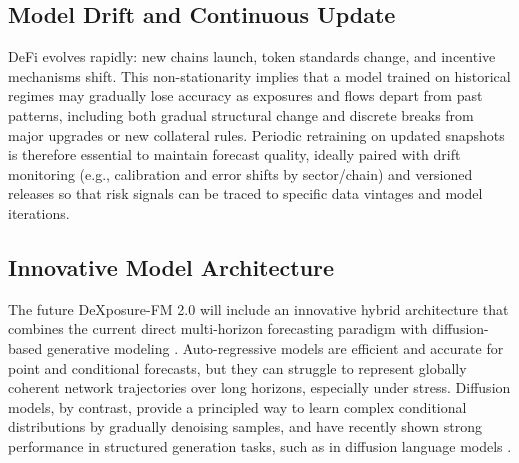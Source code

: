 \subsection{Model Drift and Continuous Update}
DeFi evolves rapidly: new chains launch, token standards change, and incentive mechanisms shift. This non-stationarity implies that a model trained on historical regimes may gradually lose accuracy as exposures and flows depart from past patterns, including both gradual structural change and discrete breaks from major upgrades or new collateral rules. Periodic retraining on updated snapshots is therefore essential to maintain forecast quality, ideally paired with drift monitoring (e.g., calibration and error shifts by sector/chain) and versioned releases so that risk signals can be traced to specific data vintages and model iterations.

\subsection{Innovative Model Architecture}
The future DeXposure-FM 2.0 will include an innovative hybrid architecture that combines the current direct multi-horizon forecasting paradigm \citep{RasulEtAl2023LagLlama} with diffusion-based generative modeling \citep{MeijerChen2024DiffusionTS}. Auto-regressive models are efficient and accurate for point and conditional forecasts, but they can struggle to represent globally coherent network trajectories over long horizons, especially under stress. Diffusion models, by contrast, provide a principled way to learn complex conditional distributions by gradually denoising samples, and have recently shown strong performance in structured generation tasks, such as in diffusion language models \citep{LiEtAl2022DiffusionLM}. %

